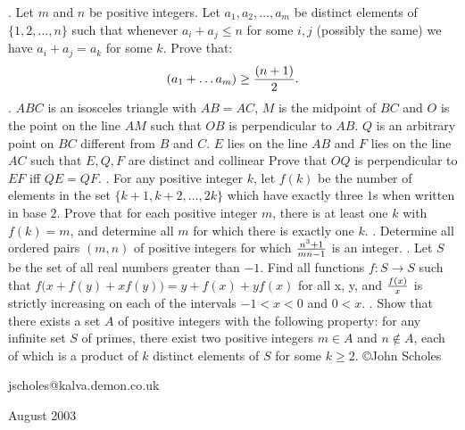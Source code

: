 \nopagenumbers
{}
\vskip 25pt
. Let $m$ and $n$ be positive integers. Let $a_1, a_2, \ldots , a_m$ be distinct elements of $\{1, 2, \ldots , n\}$ such that whenever $a_i+a_j \le n$ for some $i,j$ (possibly the same) we have $a_i+a_j=a_k$ for some $k$. Prove that: $$(a_1+\ldots a_m)\ge {(n+1) \over 2}.$$
\vskip 12pt
. $ABC$ is an isosceles triangle with $AB=AC$, $M$ is the midpoint of $BC$ and $O$ is the point on the line $AM$ such that $OB$ is perpendicular to $AB$. $Q$ is an arbitrary point on $BC$ different from $B$ and $C$. $E$ lies on the line $AB$ and $F$ lies on the line $AC$ such that $E, Q, F$ are distinct and collinear Prove that $OQ$ is perpendicular to $EF$ iff $QE=QF$.
\vskip 12pt
.  For any positive integer $k$, let $f(k)$ be the number of elements in the set $\{k+1, k+2, \ldots, 2k\}$ which have exactly three $1$s when written in base $2$. Prove that for each positive integer $m$, there is at least one $k$ with $f(k)=m$, and determine all $m$ for which there is exactly one $k$.
\vskip 12pt
. Determine all ordered pairs $(m, n)$ of positive integers for which ${n^3+1 \over mn-1}$ is an integer. 
\vskip 12pt
. Let $S$ be the set of all real numbers greater than $-1$. Find all functions $f\colon S\to S$ such that $f\bigl(x+f(y)+xf(y)\bigr) = y+f(x) +yf(x)$ for all x, y, and ${f(x)\over x}$ is strictly increasing on each of the intervals $-1<x<0$ and $0<x$.
\vskip 12pt
. Show that there exists a set $A$ of positive integers with the following property: for any infinite set $S$ of primes, there exist two positive integers $m\in A$ and $n\notin A$, each of which is a product of $k$ distinct elements of $S$ for some $k\ge 2$.
\vskip 20pt
\noindent \copyright John Scholes

\noindent jscholes@kalva.demon.co.uk

 August 2003

\bye
